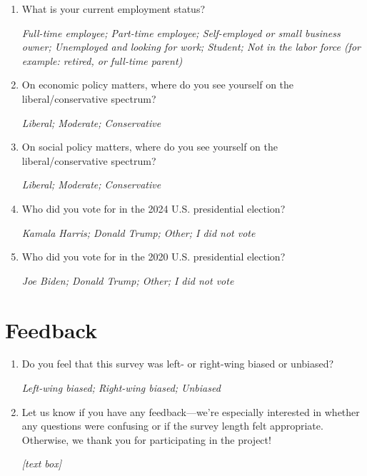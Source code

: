 \documentclass[11pt, headsepline]{article}
\begin{document}
\begin{enumerate}[resume]
    \textit{Eighth grade or less; Some high school; High school degree / GED; Some college; 2-year college degree; 4-year college degree; Master’s degree (e.g., MA, MS, MBA); Research doctorate (e.g., PhD, DSc); Professional doctorate (e.g., JD, MD)}

    \item What is your current employment status?

    \textit{Full-time employee; Part-time employee; Self-employed or small business owner; Unemployed and looking for work; Student; Not in the labor force (for example: retired, or full-time parent)}

    \item On economic policy matters, where do you see yourself on the liberal/conservative spectrum?
    
    \textit{Liberal; Moderate; Conservative}

    \item On social policy matters, where do you see yourself on the liberal/conservative spectrum?
    
    \textit{Liberal; Moderate; Conservative}

    \item Who did you vote for in the 2024 U.S. presidential election?

    \textit{Kamala Harris; Donald Trump; Other; I did not vote}

    \item Who did you vote for in the 2020 U.S. presidential election?

    \textit{Joe Biden; Donald Trump; Other; I did not vote}

\end{enumerate}

\section*{Feedback}

\begin{enumerate}[resume]

    \item Do you feel that this survey was left- or right-wing biased or unbiased?

    \textit{Left-wing biased; Right-wing biased; Unbiased}

    \item Let us know if you have any feedback—we're especially interested in whether any questions were confusing or if the survey length felt appropriate. Otherwise, we thank you for participating in the project!

    \textit{[text box]}
    
\end{enumerate}
\end{document}
